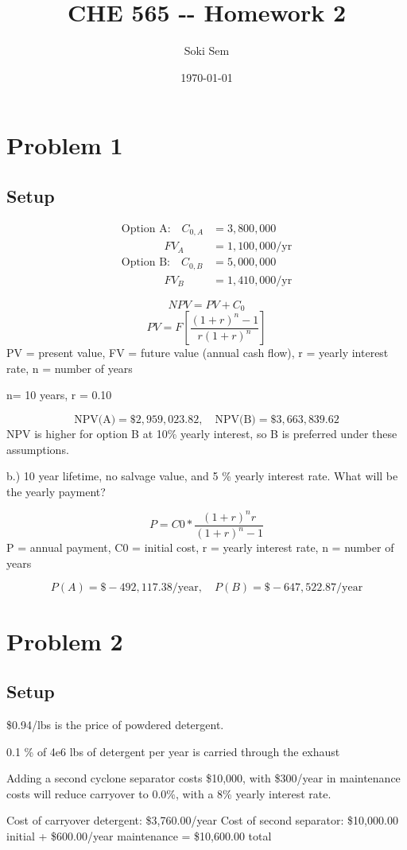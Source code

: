\documentclass{article}%
\title{CHE 565 {-}{-} Homework 2}%
\author{Soki Sem}%
\date{\today}%
\begin{document}
%
\normalsize%
\setlength{\parindent}{0pt}%
\setlength{\parskip}{0.6em}%
\maketitle%
\section*{Problem 1}%
\label{sec:Problem1}%
\subsection*{Setup}%
\label{subsec:Setup}%
\begin{align*}%
\text{Option A:}\quad C_{0,A} &= 3{,}800{,}000 \\%
\quad\quad\quad\;\;\; FV_A &= 1{,}100{,}000/\text{yr} \\%
\text{Option B:}\quad C_{0,B} &= 5{,}000{,}000 \\%
\quad\quad\quad\;\;\; FV_B &= 1{,}410{,}000/\text{yr}%
\end{align*}%
\par%
\[%
NPV = PV + C_0%
\]%
\[%
PV = F\left[\frac{(1+r)^n - 1}{r(1+r)^n}\right]%
\]%
PV = present value, FV = future value (annual cash flow), r = yearly interest rate, n = number of years%
\par%
n= 10 years, r = 0.10%
\par%
\[%
\text{NPV(A)} = \$2,959,023.82,\quad \text{NPV(B)} = \$3,663,839.62%
\]%
NPV is higher for option B at 10\% yearly interest, so B is preferred under these assumptions.%
\par%
b.) 10 year lifetime, no salvage value, and 5 \% yearly interest rate. What will be the yearly payment?%
\par%
\par%
\[%
P =  C0 * \frac{{(1 + r)^n r}}{{(1+r)^n-1}}%
\]%
P = annual payment, C0 = initial cost, r = yearly interest rate, n = number of years%
\par%
\[%
P(A) = \$-492,117.38/\text{year},\quad P(B) = \$-647,522.87/\text{year}%
\]

%
\section*{Problem 2}%
\label{sec:Problem2}%
\subsection*{Setup}%
\label{subsec:Setup}%
\$0.94/lbs is the price of powdered detergent.%
\par%
0.1 \% of 4e6 lbs of detergent per year is carried through the exhaust%
\par%
Adding a second cyclone separator costs \$10,000, with \$300/year in maintenance costs will reduce carryover to 0.0\%, with a 8\% yearly interest rate.%
\par%
Cost of carryover detergent: \$3,760.00/year\newline%
Cost of second separator: \$10,000.00 initial + \$600.00/year maintenance = \$10,600.00 total%
\par
\end{document}
